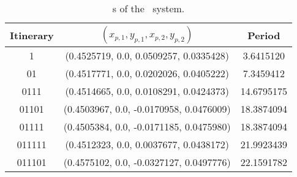 \begin{table}
	\begin{tabular}{c|c|c}
	Itinerary & $(x_{p,1}, y_{p,1}, x_{p,2}, y_{p,2})$ & Period \\
	\hline
	1 & (0.4525719,   0.0, 0.0509257, 0.0335428) & 3.6415120 \\
 	\hline
	01 & (0.4517771,   0.0, 0.0202026, 0.0405222) & 7.3459412 \\
 	\hline
	0111 & (0.4514665,   0.0, 0.0108291, 0.0424373) & 14.6795175 \\
 	\hline
	01101 & (0.4503967,   0.0, -0.0170958, 0.0476009) & 18.3874094 \\
 	\hline
	01111 & (0.4505384,   0.0, -0.0171185, 0.0475980) & 18.3874094 \\
 	\hline
	011111 & (0.4512323,   0.0, 0.0037677, 0.0438172) & 21.9923439 \\
 	\hline
	011101 & (0.4575102,   0.0, -0.0327127, 0.0497776) & 22.1591782 \\
 	\end{tabular}
	\caption{\Rpo s of the \twoMode\ system.}
	\label{tab:twomoderpos}
\end{table}
